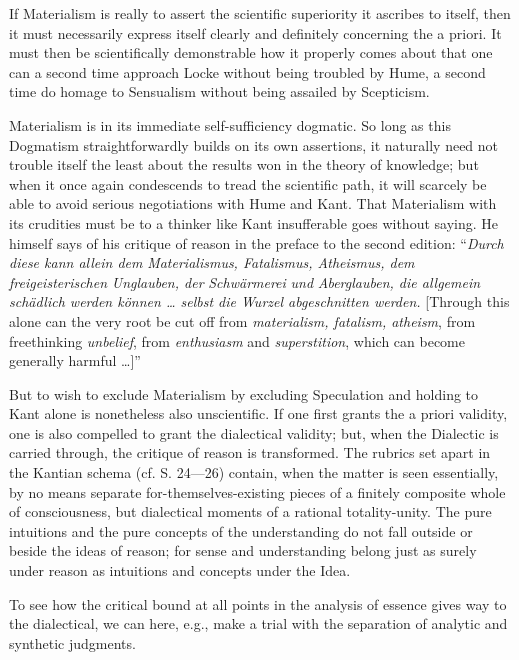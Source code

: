 \documentclass[12pt]{book}
\begin{document}
If Materialism is really to assert the scientific superiority it ascribes to itself, then it must
necessarily express itself clearly and definitely concerning the a priori. It must then be scientifically
demonstrable how it properly comes about that one can a second time approach Locke without being troubled
by Hume, a second time do homage to Sensualism without being assailed by Scepticism.

Materialism is in its immediate self-sufficiency dogmatic. So long as this Dogmatism straightforwardly
builds on its own assertions, it naturally need not trouble itself the least about the results won in the
theory of knowledge; but when it once again condescends to tread the scientific path, it will scarcely be
able to avoid serious negotiations with Hume and Kant. That Materialism with its crudities must be to a
thinker like Kant insufferable goes without saying. He himself says of his critique of reason in the
preface to the second edition: ``\textit{Durch diese kann allein dem} \emph{Materialismus, Fatalismus,
Atheismus}\textit{, dem freigeisterischen} \emph{Unglauben}\textit{, der} \emph{Schwärmerei}
\textit{und} \emph{Aberglauben}\textit{, die allgemein schädlich werden können \ldots{} selbst die Wurzel
abgeschnitten werden.} [Through this alone can the very root be cut off from \emph{materialism, fatalism,
atheism}, from freethinking \emph{unbelief}, from \emph{enthusiasm} and \emph{superstition}, which can
become generally harmful \ldots{}]''

But to wish to exclude Materialism by excluding Speculation and holding to Kant alone is nonetheless also
unscientific. If one first grants the a priori validity, one is also compelled to grant the dialectical
validity; but, when the Dialectic is carried through, the critique of reason is transformed.
The rubrics set apart in the Kantian schema (cf. S. 24---26) contain, when the matter is seen
essentially, by no means separate for-themselves-existing pieces of a finitely composite whole of
consciousness, but dialectical moments of a rational totality-unity. The pure intuitions and the pure
concepts of the understanding do not fall outside or beside the ideas of reason; for sense and
understanding belong just as surely under reason as intuitions and concepts under the Idea.

To see how the critical bound at all points in the analysis of essence gives way to the dialectical, we
can here, e.g., make a trial with the separation of analytic and synthetic judgments.
\end{document}

